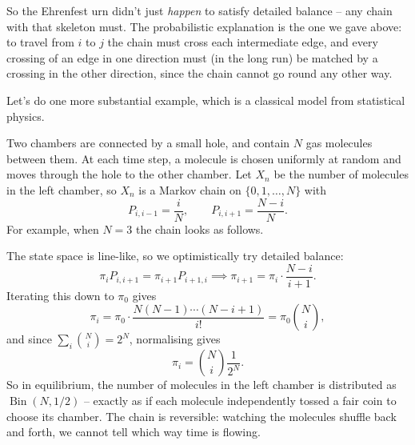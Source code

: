 \documentclass[a4paper]{scrartcl}
\begin{document}
So the Ehrenfest urn didn't just \emph{happen} to satisfy detailed balance -- any chain with that skeleton must. The probabilistic explanation is the one we gave above: to travel from $i$ to $j$ the chain must cross each intermediate edge, and every crossing of an edge in one direction must (in the long run) be matched by a crossing in the other direction, since the chain cannot go round any other way.

Let's do one more substantial example, which is a classical model from statistical physics.

\begin{example}
	Two chambers are connected by a small hole, and contain $N$ gas molecules between them. At each time step, a molecule is chosen uniformly at random and moves through the hole to the other chamber. Let $X_n$ be the number of molecules in the left chamber, so $X_n$ is a Markov chain on $\{0, 1, \dots, N\}$ with
	$$
	P_{i, i - 1} = \frac{i}{N}, \qquad P_{i, i + 1} = \frac{N - i}{N}.
	$$
	For example, when $N = 3$ the chain looks as follows.
	\begin{center}
	\end{center}
	The state space is line-like, so we optimistically try detailed balance:
	$$
	\pi_i P_{i, i + 1} = \pi_{i + 1}P_{i + 1, i} \implies \pi_{i + 1} = \pi_i \cdot \frac{N - i}{i + 1}.
	$$
	Iterating this down to $\pi_0$ gives
	$$
	\pi_i = \pi_0 \cdot \frac{N (N - 1) \cdots (N - i + 1)}{i!} = \pi_0 \binom{N}{i},
	$$
	and since $\sum_i \binom{N}{i} = 2^N$, normalising gives
	$$
	\pi_i = \binom{N}{i} \frac{1}{2^N}.
	$$
	So in equilibrium, the number of molecules in the left chamber is distributed as $\operatorname{Bin}(N, 1/2)$ -- exactly as if each molecule independently tossed a fair coin to choose its chamber. The chain is reversible: watching the molecules shuffle back and forth, we cannot tell which way time is flowing.


\end{example}
\end{document}
